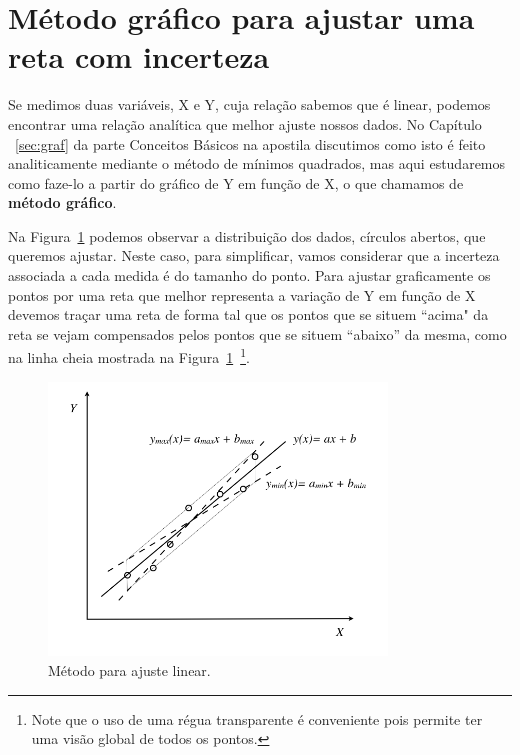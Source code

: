 \section*{Método gráfico para ajustar uma reta com incerteza}\label{retagrafico}



Se medimos duas variáveis, X e Y, cuja relação sabemos que é linear, podemos encontrar uma relação analítica que melhor ajuste nossos dados. No Capítulo ~\ref{sec:graf}  da parte Conceitos Básicos na apostila discutimos como isto é feito analiticamente mediante o método de mínimos quadrados, mas aqui estudaremos como faze-lo a partir do gráfico de Y em função de X, o que chamamos de {\bf método gráfico}.

Na Figura~\ref{fig:graflin} podemos observar a distribuição dos dados, círculos abertos, que queremos ajustar. Neste caso, para simplificar, vamos considerar que a incerteza associada a cada medida é do tamanho do ponto.  Para ajustar graficamente os pontos  por uma reta que melhor representa a variação de Y em função de X devemos traçar uma reta de forma tal que os pontos que se situem ``acima" da reta se vejam compensados pelos pontos que se situem ``abaixo'' da mesma, como na linha cheia mostrada na Figura~\ref{fig:graflin}~\footnote{Note que o uso de uma régua transparente é conveniente pois permite ter uma visão global de todos os pontos.}. 
\begin{figure}[!h]
\vspace{-0.4cm}
\begin{center}
\includegraphics[width=9cm]{fig/GraficoLinGrafico}
\caption{\label{fig:graflin} Método para ajuste linear.}
\vspace{-0.4cm}
\end{center}
\end{figure}


